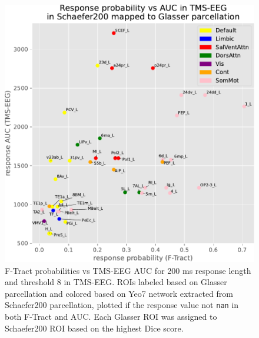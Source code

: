 \begin{figure}
  \begin{center}
    \includegraphics[width=\textwidth]{images/nootebook_generated/tmseeg_ftract_responses_comparison/AUC/Response_probability_vs_AUC_in_TMS-EEG_in_Schaefer200_mapped_to_Glasser_parcellation.pdf}
  \end{center}
  \caption[F-Tract probabilities vs TMS-EEG AUC]{F-Tract probabilities vs TMS-EEG AUC for 200 ms response length and threshold 8 in TMS-EEG. ROIs labeled based on Glasser parcellation and colored based on Yeo7 network extracted from Schaefer200 parcellation, plotted if the response value not \texttt{nan} in both F-Tract and AUC. Each Glasser ROI was assigned to Schaefer200 ROI based on the highest Dice score.}
  \label{fig:response_tmsAUC-ftract_scatter}
\end{figure}

